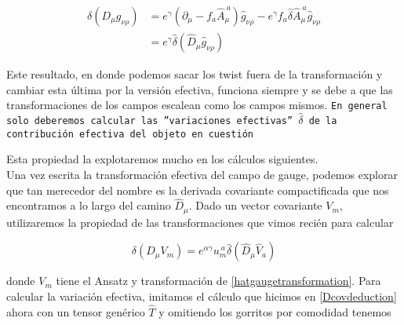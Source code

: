 \documentclass{article}
\numberwithin{equation}{section}
\begin{document}
\begin{equation}
\begin{aligned}
\delta \left( D_{\mu} g_{\nu \rho} \right) &= e^{\gamma} \left( \partial_{\mu} - f_a \hat{A}_{\mu}^{\ a} \right) \hat{g}_{\nu \rho} - e^{\gamma} f_a \hat{\delta} \hat{A}_{\mu}^{\ a} \hat{g}_{\nu \rho}\\
&= e^{\gamma} \hat{\delta} \left(\hat{D}_{\mu} \hat{g}_{\nu \rho}\right)
\end{aligned}
\end{equation}

Este resultado, en donde podemos sacar los twist fuera de la transformación y cambiar esta última por la versión efectiva, funciona siempre y se debe a que las transformaciones de los campos escalean como los campos mismos. \texttt{En general solo deberemos calcular las ''variaciones efectivas'' $ \hat{\delta} $ de la contribución efectiva del objeto en cuestión}

Esta propiedad la explotaremos mucho en los cálculos siguientes.\\

Una vez escrita la transformación efectiva del campo de gauge, podemos explorar que tan merecedor del nombre es la derivada covariante compactificada que nos encontramos a lo largo del camino $ \hat{D}_{\mu} $. Dado un vector covariante $ V_m $, utilizaremos la propiedad de las transformaciones que vimos recién para calcular

\begin{equation}
\delta \left( D_{\mu} V_m\right) = e^{\alpha \gamma} u_m^{\ a} \hat{\delta} \left( \hat{D}_{\mu} \hat{V}_a\right)
\end{equation}

donde $ V_m $ tiene el Ansatz y transformación de \ref{hatgaugetransformation}. Para calcular la variación efectiva, imitamos el cálculo que hicimos en \ref{Dcovdeduction} ahora con un tensor genérico $ \hat{T} $ y omitiendo los gorritos por comodidad tenemos
\end{document}
